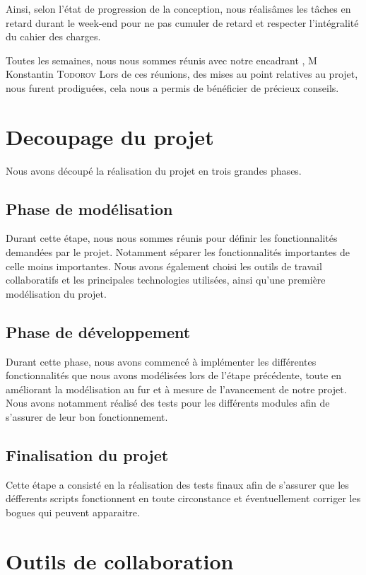 \documentclass[oneside,13pt,a4paper]{report}
\begin{document}
Ainsi, selon l'état de progression de la conception, nous réalisâmes les tâches en retard durant le week-end pour ne pas cumuler de retard et respecter l'intégralité du cahier des charges.

Toutes les semaines, nous nous sommes réunis avec notre encadrant , M Konstantin \textsc{Todorov} Lors de ces réunions, des mises au point relatives au projet, nous furent prodiguées, cela nous a permis de bénéficier de précieux conseils.

\section{Decoupage du projet}

Nous avons découpé la réalisation du projet en trois grandes phases.

\subsection{Phase de modélisation}

Durant cette étape, nous nous sommes réunis pour définir les fonctionnalités demandées par le projet. Notamment séparer les fonctionnalités importantes de celle moins importantes. Nous avons également choisi les outils de travail collaboratifs et les principales technologies utilisées, ainsi qu’une première modélisation du projet.

\subsection{Phase de développement}

Durant cette phase, nous avons commencé à implémenter les différentes fonctionnalités que nous avons modélisées lors de l'étape précédente, toute en améliorant la modélisation au fur et à mesure de l'avancement de notre projet. Nous avons notamment réalisé des tests pour les différents modules afin de s'assurer de leur bon fonctionnement.

\subsection{Finalisation du projet}

Cette étape a consisté en la réalisation des tests finaux afin de s'assurer que les défferents scripts fonctionnent en toute circonstance et éventuellement corriger les bogues qui peuvent apparaitre.

\section{Outils de collaboration}
\end{document}
